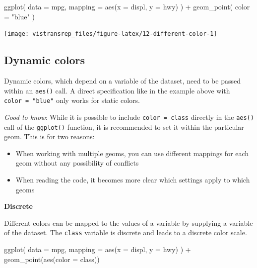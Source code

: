 \documentclass[]{book}
\newenvironment{Shaded}{}{}
\newcommand{\DataTypeTok}[1]{#1}
\newcommand{\KeywordTok}[1]{\textcolor[rgb]{0.00,0.00,1.00}{#1}}
\newcommand{\NormalTok}[1]{#1}
\newcommand{\OperatorTok}[1]{#1}
\newcommand{\StringTok}[1]{\textcolor[rgb]{0.00,0.50,0.50}{#1}}
\providecommand{\tightlist}{%
  \setlength{\itemsep}{0pt}\setlength{\parskip}{0pt}}
\begin{document}
\begin{Shaded}
\begin{Highlighting}[]
\KeywordTok{ggplot}\NormalTok{(}
  \DataTypeTok{data =}\NormalTok{ mpg,}
  \DataTypeTok{mapping =} \KeywordTok{aes}\NormalTok{(}\DataTypeTok{x =}\NormalTok{ displ, }\DataTypeTok{y =}\NormalTok{ hwy)}
\NormalTok{) }\OperatorTok{+}
\StringTok{  }\KeywordTok{geom_point}\NormalTok{(}
    \DataTypeTok{color =} \StringTok{"blue"}
\NormalTok{  )}
\end{Highlighting}
\end{Shaded}

\begin{flushright}\texttt{[image: vistransrep\_files/figure-latex/12-different-color-1]} \end{flushright}

\hypertarget{dynamic-colors}{%
\subsection{Dynamic colors}\label{dynamic-colors}}

Dynamic colors, which depend on a variable of the dataset, need to be passed within an \texttt{aes()} call.
A direct specification like in the example above with \texttt{color\ =\ "blue"} only works for static colors.

\emph{Good to know}: While it is possible to include \texttt{color\ =\ class} directly in the \texttt{aes()} call of the \texttt{ggplot()} function, it is recommended to set it within the particular geom.
This is for two reasons:

\begin{itemize}
\tightlist
\item
  When working with multiple geoms, you can use different mappings for each geom without any possibility of conflicts
\item
  When reading the code, it becomes more clear which settings apply to which geoms
\end{itemize}

\textbf{Discrete}

Different colors can be mapped to the values of a variable by supplying a variable of the dataset.
The \texttt{class} variable is discrete and leads to a discrete color scale.

\begin{Shaded}
\begin{Highlighting}[]
\KeywordTok{ggplot}\NormalTok{(}
  \DataTypeTok{data =}\NormalTok{ mpg,}
  \DataTypeTok{mapping =} \KeywordTok{aes}\NormalTok{(}\DataTypeTok{x =}\NormalTok{ displ, }\DataTypeTok{y =}\NormalTok{ hwy)}
\NormalTok{) }\OperatorTok{+}
\StringTok{  }\KeywordTok{geom_point}\NormalTok{(}\KeywordTok{aes}\NormalTok{(}\DataTypeTok{color =}\NormalTok{ class))}
\end{Highlighting}
\end{Shaded}
\end{document}
